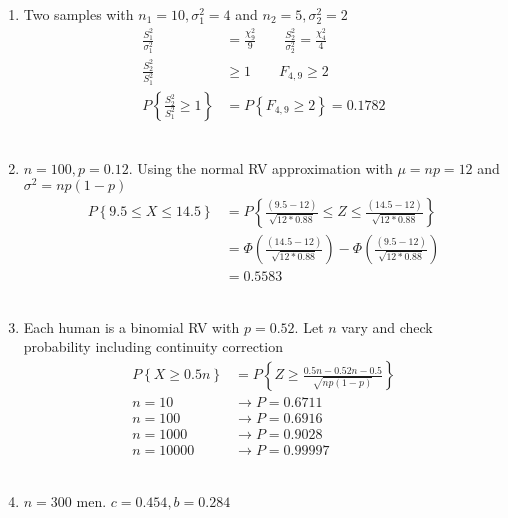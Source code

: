 \begin{enumerate}
	\item Two samples with $ n_1 = 10, \sigma^2_1  = 4$ and $ n_2 = 5, \sigma^2_2  = 2$ \\
	
	
		\begin{align}
			\frac{S_1^2}{\sigma_1^2} &= \frac{\chi_9^2}{9} \qquad \frac{S_2^2}{\sigma_2^2} = \frac{\chi_4^2}{4} \nonumber \\
			\frac{S_2^2}{S_1^2} &\geq 1 \qquad F_{4, 9} \geq 2 \nonumber \\
			P  \left\{\frac{S_2^2}{S_1^2}  \geq 1\right\}  &= P \left\{F_{4, 9} \geq 2\right\}= 0.1782
		\end{align}\\
	
	
	\item $ n = 100, p  = 0.12$. Using the normal RV approximation with $ \mu = np = 12 $ and $ \sigma^2 = np(1-p)$ \\
	
	
		\begin{align}
			P \left\{9.5 \leq X \leq 14.5 \right\} &= P \left\{\frac{(9.5 - 12)}{\sqrt{12*0.88}} \leq Z \leq \frac{(14.5 - 12)}{\sqrt{12*0.88}} \right\} \nonumber \\
			&= \Phi  \left(\frac{(14.5 - 12)}{\sqrt{12*0.88}}\right) - \Phi  \left(\frac{(9.5 - 12)}{\sqrt{12*0.88}}\right)  \nonumber \\
			&= 0.5583
		\end{align}\\
	
	
	\item Each human is a binomial RV with $ p = 0.52 $. Let $ n $ vary and check probability including continuity correction\\
	
		\begin{align}
			P \left\{ X \geq 0.5n \right\} &= P \left\{ Z \geq \frac{0.5n - 0.52n - 0.5}{\sqrt{np(1-p)}} \right\} \\
			n = 10 &\to P = 0.6711 \nonumber \\
			n = 100 &\to P = 0.6916 \nonumber \\
			n = 1000 &\to P = 0.9028 \nonumber \\
			n = 10000 &\to P = 0.99997 \nonumber 
		\end{align}\\
	
	
	\item $ n = 300 $ men. $ c = 0.454, b = 0.284 $ \\
	

\end{enumerate}
